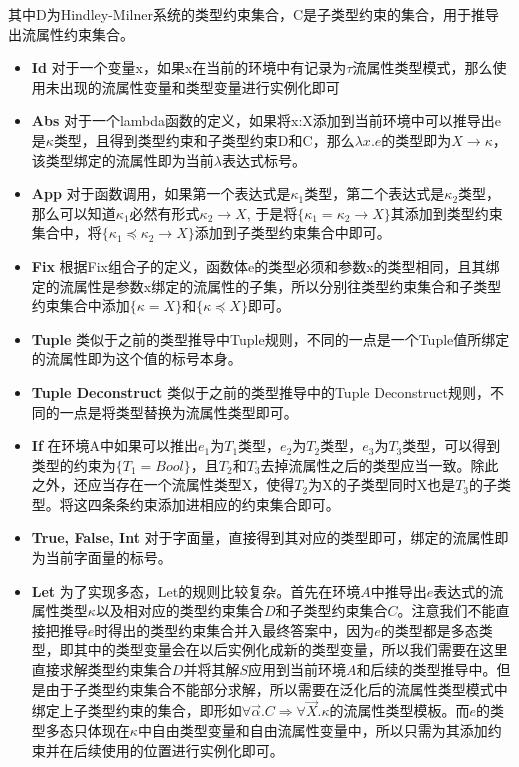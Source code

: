 \documentclass[UTF8, colorlinks]{pkuthss}
\begin{document}
	其中D为Hindley-Milner系统的类型约束集合，C是子类型约束的集合，用于推导出流属性约束集合。
	\begin{itemize}
	\item \textbf{Id} 对于一个变量x，如果x在当前的环境中有记录为$\tau$流属性类型模式，那么使用未出现的流属性变量和类型变量进行实例化即可
	\item \textbf{Abs} 对于一个lambda函数的定义，如果将x:X添加到当前环境中可以推导出e是$\kappa$类型，且得到类型约束和子类型约束D和C，那么$\lambda x.e$的类型即为$X\to\kappa$，该类型绑定的流属性即为当前$\lambda$表达式标号。  
	\item \textbf{App} 对于函数调用，如果第一个表达式是$\kappa_1$类型，第二个表达式是$\kappa_2$类型，那么可以知道$\kappa_1$必然有形式$\kappa_2 \to X$, 于是将$\{\kappa_1 =  \kappa_2\to X\}$其添加到类型约束集合中，将$\{\kappa_1\preceq\kappa_2\to X\}$添加到子类型约束集合中即可。
	\item \textbf{Fix} 根据Fix组合子的定义，函数体e的类型必须和参数x的类型相同，且其绑定的流属性是参数x绑定的流属性的子集，所以分别往类型约束集合和子类型约束集合中添加$\{\kappa= X\}$和$\{\kappa\preceq X\}$即可。
	\item \textbf{Tuple} 类似于之前的类型推导中Tuple规则，不同的一点是一个Tuple值所绑定的流属性即为这个值的标号本身。
	\item \textbf{Tuple Deconstruct} 类似于之前的类型推导中的Tuple Deconstruct规则，不同的一点是将类型替换为流属性类型即可。
	\item \textbf{If} 在环境A中如果可以推出$e_1$为$T_1$类型，$e_2$为$T_2$类型，$e_3$为$T_3$类型，可以得到类型的约束为$\{T_1 = Bool\}$，且$T_2$和$T_3$去掉流属性之后的类型应当一致。除此之外，还应当存在一个流属性类型X，使得$T_2$为X的子类型同时X也是$T_3$的子类型。将这四条条约束添加进相应的约束集合即可。
	\item \textbf{True, False, Int} 对于字面量，直接得到其对应的类型即可，绑定的流属性即为当前字面量的标号。
	\item \textbf{Let} 为了实现多态，Let的规则比较复杂。首先在环境$A$中推导出$e$表达式的流属性类型$\kappa$以及相对应的类型约束集合$D$和子类型约束集合$C$。注意我们不能直接把推导$e$时得出的类型约束集合并入最终答案中，因为$e$的类型都是多态类型，即其中的类型变量会在以后实例化成新的类型变量，所以我们需要在这里直接求解类型约束集合$D$并将其解$S$应用到当前环境$A$和后续的类型推导中。但是由于子类型约束集合不能部分求解，所以需要在泛化后的流属性类型模式中绑定上子类型约束的集合，即形如$\forall\vec{\alpha}.C\Rightarrow\forall\vec{X}.\kappa$的流属性类型模板。而$e$的类型多态只体现在$\kappa$中自由类型变量和自由流属性变量中，所以只需为其添加约束并在后续使用的位置进行实例化即可。
	\end{itemize}
	
\end{document}
